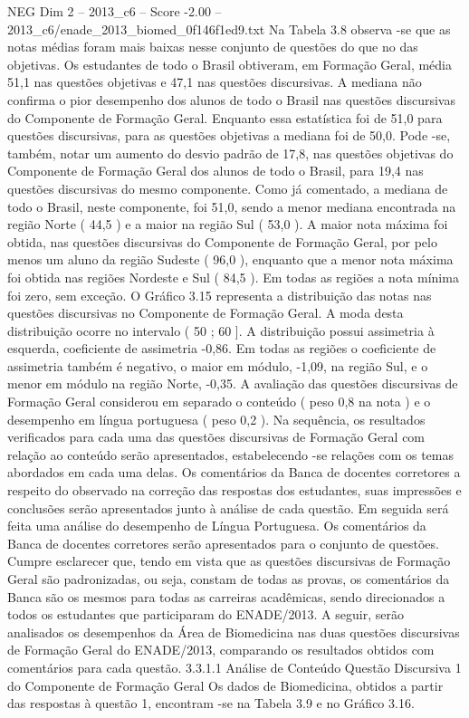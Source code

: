 \begin{textsample}{NEG Dim 2 – 2013\_c6 – Score -2.00 – 2013\_c6/enade\_2013\_biomed\_0f146f1ed9.txt}
Na Tabela 3.8 observa -se que as notas médias foram mais baixas nesse conjunto de questões do que no das objetivas.
Os estudantes de todo o Brasil obtiveram, em Formação Geral, média 51,1 nas questões objetivas e 47,1 nas questões discursivas.
A mediana não confirma o pior desempenho dos alunos de todo o Brasil nas questões discursivas do Componente de Formação Geral.
Enquanto essa estatística foi de 51,0 para questões discursivas, para as questões objetivas a mediana foi de 50,0.
Pode -se, também, notar um aumento do desvio padrão de 17,8, nas questões objetivas do Componente de Formação Geral dos alunos de todo o Brasil, para 19,4 nas questões discursivas do mesmo componente.
Como já comentado, a mediana de todo o Brasil, neste componente, foi 51,0, sendo a menor mediana encontrada na região Norte ( 44,5 ) e a maior na região Sul ( 53,0 ).
A maior nota máxima foi obtida, nas questões discursivas do Componente de Formação Geral, por pelo menos um aluno da região Sudeste ( 96,0 ), enquanto que a menor nota máxima foi obtida nas regiões Nordeste e Sul ( 84,5 ).
Em todas as regiões a nota mínima foi zero, sem exceção.
O Gráfico 3.15 representa a distribuição das notas nas questões discursivas no Componente de Formação Geral.
A moda desta distribuição ocorre no intervalo ( 50 ; 60 ].
A distribuição possui assimetria à esquerda, coeficiente de assimetria -0,86.
Em todas as regiões o coeficiente de assimetria também é negativo, o maior em módulo, -1,09, na região Sul, e o menor em módulo na região Norte, -0,35.
A avaliação das questões discursivas de Formação Geral considerou em separado o conteúdo ( peso 0,8 na nota ) e o desempenho em língua portuguesa ( peso 0,2 ).
Na sequência, os resultados verificados para cada uma das questões discursivas de Formação Geral com relação ao conteúdo serão apresentados, estabelecendo -se relações com os temas abordados em cada uma delas.
Os comentários da Banca de docentes corretores a respeito do observado na correção das respostas dos estudantes, suas impressões e conclusões serão apresentados junto à análise de cada questão.
Em seguida será feita uma análise do desempenho de Língua Portuguesa.
Os comentários da Banca de docentes corretores serão apresentados para o conjunto de questões.
Cumpre esclarecer que, tendo em vista que as questões discursivas de Formação Geral são padronizadas, ou seja, constam de todas as provas, os comentários da Banca são os mesmos para todas as carreiras acadêmicas, sendo direcionados a todos os estudantes que participaram do ENADE/2013.
A seguir, serão analisados os desempenhos da Área de Biomedicina nas duas questões discursivas de Formação Geral do ENADE/2013, comparando os resultados obtidos com comentários para cada questão. 3.3.1.1 Análise de Conteúdo Questão Discursiva 1 do Componente de Formação Geral Os dados de Biomedicina, obtidos a partir das respostas à questão 1, encontram -se na Tabela 3.9 e no Gráfico 3.16.

\end{textsample}
